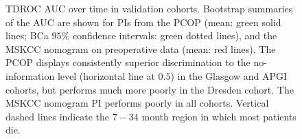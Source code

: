 \documentclass[dissertation.tex]{subfiles}
\begin{document}
\begin{figure}
\centering
\caption[\texorpdfstring{\acrshort{TDROC}}{TD-ROC} \texorpdfstring{\acrshort{AUC}}{AUC} paths for \texorpdfstring{\acrshort{PCOP}}{PCOP} in validation data]{\gls{TDROC} \gls{AUC} over time in validation cohorts.  Bootstrap summaries of the \gls{AUC} are shown for \glspl{PI} from the \gls{PCOP} (mean: green solid lines; BCa $95\%$ confidence intervals: green dotted lines), and the \gls{MSKCC} nomogram on preoperative data (mean: red lines).  The \gls{PCOP} displays consistently superior discrimination to the no-information level (horizontal line at $0.5$) in the Glasgow and \gls{APGI} cohorts, but performs much more poorly in the Dresden cohort.  The \gls{MSKCC} nomogram \gls{PI} performs poorly in all cohorts.  Vertical dashed lines indicate the $7-34$ month region in which most patients die.}
\label{fig:nomo-val-tdroc}
\end{figure}
\end{document}

